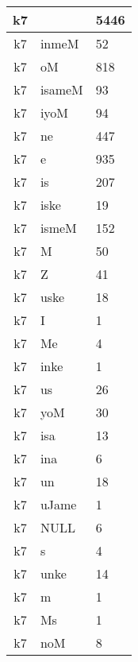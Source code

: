 \documentclass[a4 paper]{article}
\begin{document}
\begin{longtable}{cp{}p{}}
k7 &  & 5446\\ \midrule k7 & inmeM & 52\\ \midrule k7 & oM & 818\\ \midrule k7 & isameM & 93\\ \midrule k7 & iyoM & 94\\ \midrule k7 & ne & 447\\ \midrule k7 & e & 935\\ \midrule k7 & is & 207\\ \midrule k7 & iske & 19\\ \midrule k7 & ismeM & 152\\ \midrule k7 & M & 50\\ \midrule k7 & Z & 41\\ \midrule k7 & uske & 18\\ \midrule k7 & I & 1\\ \midrule k7 & Me & 4\\ \midrule k7 & inke & 1\\ \midrule k7 & us & 26\\ \midrule k7 & yoM & 30\\ \midrule k7 & isa & 13\\ \midrule k7 & ina & 6\\ \midrule k7 & un & 18\\ \midrule k7 & uJame & 1\\ \midrule k7 & NULL & 6\\ \midrule k7 & s & 4\\ \midrule k7 & unke & 14\\ \midrule k7 & m & 1\\ \midrule k7 & Ms & 1\\ \midrule k7 & noM & 8\\ 
\end{longtable}
\end{document}
